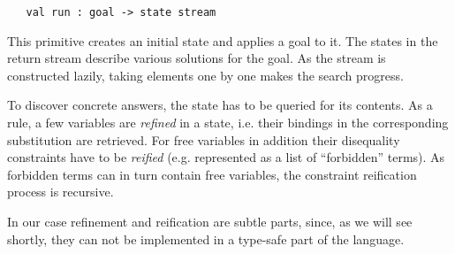 \begin{lstlisting}
   val run : goal -> state stream
\end{lstlisting}

This primitive creates an initial state and applies a goal to it. The states in the return stream describe
various solutions for the goal. As the stream is constructed lazily, taking elements one by one makes
the search progress.

To discover concrete answers, the state has to be queried for its contents. As a rule, a few variables
are \emph{refined} in a state, i.e. their bindings in the corresponding substitution are retrieved. For free
variables in addition their disequality constraints have to be \emph{reified} (e.g. represented as a list of
``forbidden'' terms). As forbidden terms can in turn contain free variables, the constraint reification
process is recursive.

In our case refinement and reification are subtle parts, since, as we will see shortly, they can not be
implemented in a type-safe part of the language.
